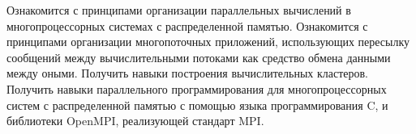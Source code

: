 
Ознакомится с принципами организации параллельных вычислений в многопроцессорных системах с распределенной памятью. Ознакомится с принципами организации многопоточных приложений, использующих пересылку сообщений между вычислительными потоками как средство обмена данными между оными. Получить навыки построения вычислительных кластеров. Получить навыки параллельного программирования для многопроцессорных систем с распределенной памятью с помощью языка программирования C, \gl и библиотеки OpenMPI, реализующей стандарт MPI.

